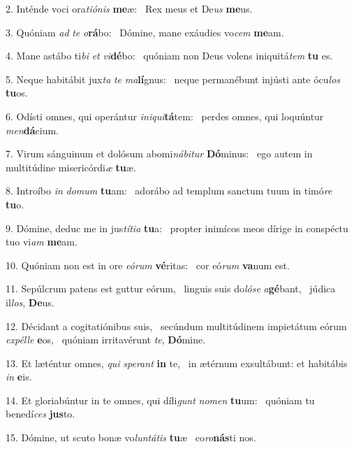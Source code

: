 2. Inténde voci ora\textit{ti}\textit{ó}\textit{nis} \textbf{me}æ: \ast\  Rex meus et De\textit{us} \textbf{me}us.\

3. Quóniam \textit{ad} \textit{te} \textit{o}\textbf{rá}bo: \ast\  Dómine, mane exáudies vo\textit{cem} \textbf{me}am.\

4. Mane astábo ti\textit{bi} \textit{et} \textit{vi}\textbf{dé}bo: \ast\  quóniam non Deus volens iniquitá\textit{tem} \textbf{tu} es.\

5. Neque habitábit jux\textit{ta} \textit{te} \textit{ma}\textbf{lí}gnus: \ast\  neque permanébunt injústi ante ócu\textit{los} \textbf{tu}os.\

6. Odísti omnes, qui operántur \textit{in}\textit{i}\textit{qui}\textbf{tá}tem: \ast\  perdes omnes, qui loquúntur \textit{men}\textbf{dá}cium.\

7. Virum sánguinum et dolósum abomi\textit{ná}\textit{bi}\textit{tur} \textbf{Dó}minus: \ast\  ego autem in multitúdine misericórdi\textit{æ} \textbf{tu}æ.\

8. Introíbo \textit{in} \textit{do}\textit{mum} \textbf{tu}am: \ast\  adorábo ad templum sanctum tuum in timó\textit{re} \textbf{tu}o.\

9. Dómine, deduc me in jus\textit{tí}\textit{ti}\textit{a} \textbf{tu}a: \ast\  propter inimícos meos dírige in conspéctu tuo vi\textit{am} \textbf{me}am.\

10. Quóniam non est in ore \textit{e}\textit{ó}\textit{rum} \textbf{vé}ritas: \ast\  cor eó\textit{rum} \textbf{va}num est.\

11. Sepúlcrum patens est guttur eórum, \dag\  linguis suis do\textit{ló}\textit{se} \textit{a}\textbf{gé}bant, \ast\  júdica il\textit{los}, \textbf{De}us.\

12. Décidant a cogitatiónibus suis, \dag\  secúndum multitúdinem impietátum eórum \textit{ex}\textit{pél}\textit{le} \textbf{e}os, \ast\  quóniam irritavérunt \textit{te}, \textbf{Dó}mine.\

13. Et læténtur omnes, \textit{qui} \textit{spe}\textit{rant} \textbf{in} te, \ast\  in ætérnum exsultábunt: et habitábis \textit{in} \textbf{e}is.\

14. Et gloriabúntur in te omnes, qui díli\textit{gunt} \textit{no}\textit{men} \textbf{tu}um: \ast\  quóniam tu benedí\textit{ces} \textbf{jus}to.\

15. Dómine, ut scuto bonæ vo\textit{lun}\textit{tá}\textit{tis} \textbf{tu}æ \ast\  co\textit{ro}\textbf{nás}ti nos.\


